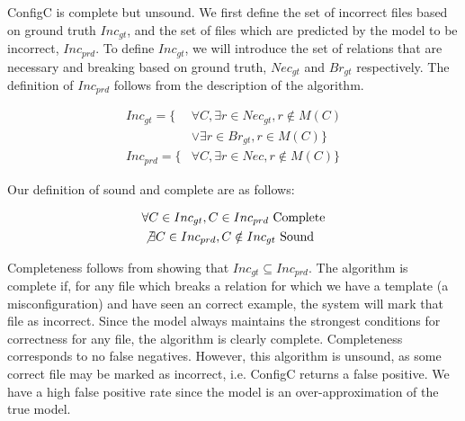 

ConfigC is complete but unsound.
We first define the set of incorrect files based on ground truth $Inc_{gt}$, and the set of files which are predicted by the model to be incorrect, $Inc_{prd}$.
To define $Inc_{gt}$, we will introduce the set of relations that are necessary and breaking based on ground truth, $Nec_{gt}$ and $Br_{gt}$ respectively.
The definition of $Inc_{prd}$ follows from the description of the algorithm.

\begin{align}
Inc_{gt} = \{&\forall C, \exists r \in Nec_{gt}, r \notin M(C)\\ \nonumber
 &\lor \exists r \in Br_{gt}, r \in M(C)\} \\
Inc_{prd} = \{&\forall C, \exists r \in Nec, r \notin M(C)\}
\end{align}

Our definition of sound and complete are as follows:

\begin{align}
&\forall C \in Inc_{gt}, C \in Inc_{prd} \text{  Complete} \\
&\not \exists C \in Inc_{prd}, C \notin Inc_{gt} \text{  Sound}
\end{align}

Completeness follows from showing that $Inc_{gt} \subseteq Inc_{prd}$.
The algorithm is complete if, for any file which breaks a relation for which we have a template (a misconfiguration) and have seen an correct example, the system will mark that file as incorrect.
Since the model always maintains the strongest conditions for correctness for any file, the algorithm is clearly complete.
Completeness corresponds to no false negatives.
However, this algorithm is unsound, as some correct file may be marked as incorrect, i.e. ConfigC returns a false positive.
We have a high false positive rate since the model is an over-approximation of the true model.
